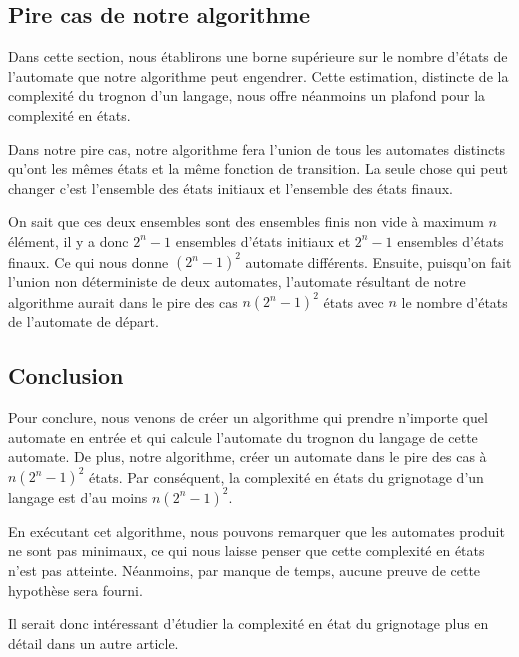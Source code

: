 \newpage
\subsection{Pire cas de notre algorithme}

Dans cette section, nous établirons une borne supérieure sur le nombre
d’états de l’automate que notre algorithme peut engendrer. Cette estimation,
distincte de la complexité du trognon d’un langage, nous offre néanmoins un
plafond pour la complexité en états.

\vphantom{}

Dans notre pire cas, notre algorithme fera l'union de tous les automates
distincts qu'ont les mêmes états et la même fonction de transition. La seule
chose qui peut changer c'est l'ensemble des états initiaux et l'ensemble des
états finaux.

\vphantom{}

On sait que ces deux ensembles sont des ensembles finis non vide à maximum
\(n\) élément, il y a donc \(2^n - 1\) ensembles d'états initiaux et \(2^n -
1\) ensembles d'états finaux. Ce qui nous donne \((2^n - 1)^2\) automate
différents. Ensuite, puisqu'on fait l'union non déterministe de deux
automates, l'automate résultant de notre algorithme aurait dans le pire des
cas \(n(2^n - 1)^2\) états avec \(n\) le nombre d'états de l'automate de
départ.

\subsection{Conclusion}

Pour conclure, nous venons de créer un algorithme qui prendre n'importe quel
automate en entrée et qui calcule l'automate du trognon du langage de cette
automate. De plus, notre algorithme, créer un automate dans le pire des cas à
\(n(2^n - 1)^2\) états. Par conséquent, la complexité en états du grignotage
d'un langage est d'au moins \(n(2^n - 1)^2\).

\vphantom{}

En exécutant cet algorithme, nous pouvons remarquer que les automates produit
ne sont pas minimaux, ce qui nous laisse penser que cette complexité en états
n'est pas atteinte. Néanmoins, par manque de temps, aucune preuve de cette
hypothèse sera fourni.

\vphantom{}

Il serait donc intéressant d'étudier la complexité en état du grignotage plus
en détail dans un autre article.
